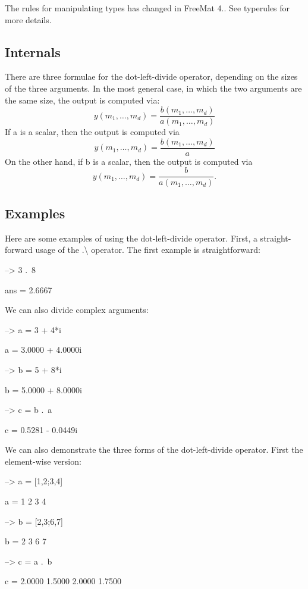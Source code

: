 The rules for manipulating types has changed in Free\-Mat 4.. See {\ttfamily typerules} for more details.\hypertarget{transforms_svd_Function}{}\subsection{Internals}\label{transforms_svd_Function}
There are three formulae for the dot-\/left-\/divide operator, depending on the sizes of the three arguments. In the most general case, in which the two arguments are the same size, the output is computed via\-: \[ y(m_1,\ldots,m_d) = \frac{b(m_1,\ldots,m_d)}{a(m_1,\ldots,m_d)} \] If {\ttfamily a} is a scalar, then the output is computed via \[ y(m_1,\ldots,m_d) = \frac{b(m_1,\ldots,m_d)}{a} \] On the other hand, if {\ttfamily b} is a scalar, then the output is computed via \[ y(m_1,\ldots,m_d) = \frac{b}{a(m_1,\ldots,m_d)}. \] \hypertarget{variables_matrix_Examples}{}\subsection{Examples}\label{variables_matrix_Examples}
Here are some examples of using the dot-\/left-\/divide operator. First, a straight-\/forward usage of the {\ttfamily .\textbackslash{}} operator. The first example is straightforward\-:


\begin{DoxyVerbInclude}
--> 3 .\ 8

ans = 
    2.6667 
\end{DoxyVerbInclude}


We can also divide complex arguments\-:


\begin{DoxyVerbInclude}
--> a = 3 + 4*i

a = 
   3.0000 +  4.0000i 

--> b = 5 + 8*i

b = 
   5.0000 +  8.0000i 

--> c = b .\ a

c = 
   0.5281 -  0.0449i 
\end{DoxyVerbInclude}


We can also demonstrate the three forms of the dot-\/left-\/divide operator. First the element-\/wise version\-:


\begin{DoxyVerbInclude}
--> a = [1,2;3,4]

a = 
 1 2 
 3 4 

--> b = [2,3;6,7]

b = 
 2 3 
 6 7 

--> c = a .\ b

c = 
    2.0000    1.5000 
    2.0000    1.7500 
\end{DoxyVerbInclude}


